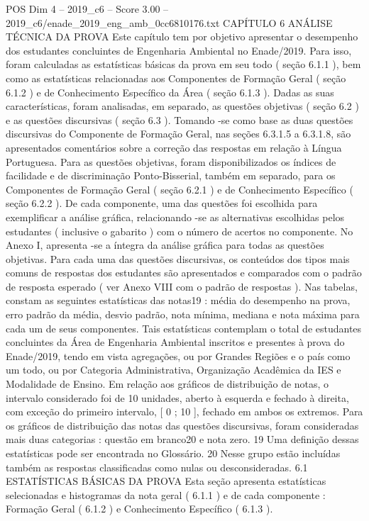 \begin{textsample}{POS Dim 4 – 2019\_c6 – Score 3.00 – 2019\_c6/enade\_2019\_eng\_amb\_0cc6810176.txt}  \label{ex:f4_pos_095}
CAPÍTULO 6 ANÁLISE TÉCNICA DA PROVA Este capítulo tem por objetivo apresentar o desempenho dos estudantes concluintes de Engenharia Ambiental no Enade/2019.
Para isso, foram calculadas as estatísticas básicas da prova em seu todo ( seção 6.1.1 ), bem como as estatísticas relacionadas aos Componentes de Formação Geral ( seção 6.1.2 ) e de Conhecimento Específico da Área ( seção 6.1.3 ).
Dadas as suas características, foram analisadas, em separado, as questões objetivas ( seção 6.2 ) e as questões discursivas ( seção 6.3 ).
Tomando -se como base as duas questões discursivas do Componente de Formação Geral, nas seções 6.3.1.5 a 6.3.1.8, são apresentados comentários sobre a correção das respostas em relação à Língua Portuguesa.
Para as questões objetivas, foram disponibilizados os índices de facilidade e de discriminação Ponto-Bisserial, também em separado, para os Componentes de Formação Geral ( seção 6.2.1 ) e de Conhecimento Específico ( seção 6.2.2 ).
De cada componente, uma das questões foi escolhida para exemplificar a análise gráfica, relacionando -se as alternativas escolhidas pelos estudantes ( inclusive o gabarito ) com o número de acertos no componente.
No Anexo I, apresenta -se a íntegra da análise gráfica para todas as questões objetivas.
Para cada uma das questões discursivas, os conteúdos dos tipos mais comuns de respostas dos estudantes são apresentados e comparados com o padrão de resposta esperado ( ver Anexo VIII com o padrão de respostas ).
Nas tabelas, constam as seguintes estatísticas das notas19 : média do desempenho na prova, erro padrão da média, desvio padrão, nota mínima, mediana e nota máxima para cada um de seus componentes.
Tais estatísticas contemplam o total de estudantes concluintes da Área de Engenharia Ambiental inscritos e presentes à prova do Enade/2019, tendo em vista agregações, ou por Grandes Regiões e o país como um todo, ou por Categoria Administrativa, Organização Acadêmica da IES e Modalidade de Ensino.
Em relação aos gráficos de distribuição de notas, o intervalo considerado foi de 10 unidades, aberto à esquerda e fechado à direita, com exceção do primeiro intervalo, [ 0 ; 10 ], fechado em ambos os extremos.
Para os gráficos de distribuição das notas das questões discursivas, foram consideradas mais duas categorias : questão em branco20 e nota zero. 19 Uma definição dessas estatísticas pode ser encontrada no Glossário. 20 Nesse grupo estão incluídas também as respostas classificadas como nulas ou desconsideradas. 6.1 ESTATÍSTICAS BÁSICAS DA PROVA Esta seção apresenta estatísticas selecionadas e histogramas da nota geral ( 6.1.1 ) e de cada componente : Formação Geral ( 6.1.2 ) e Conhecimento Específico ( 6.1.3 ).

\end{textsample}
